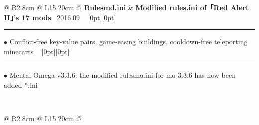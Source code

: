 {{\begin{tabularx}{\linewidth}{@{} R{2.8cm} @{\phantom{d}} L{15.20cm} @{}}
	\textbf{Rulesmd.ini} & \hspace{10pt} \textbf{Modified rules.ini of「Red Alert II」's 17 mods} \hfill \textendash\ 2016.09 \newline \vspace{2pt} \ \hspace{-3pt} \raisebox{0.09\height}[0pt][0pt]{\vrule width0.5pt height30.0pt} \hspace{-0.30em}\rule[0.25em]{1.0em}{0.5pt}\!\! $\bullet$ {\small Conflict-free key-value pairs, game-easing buildings, cooldown-free teleporting minecarts} \newline \vspace{-3pt} \ \hspace{-3pt} \raisebox{0.18\height}[0pt][0pt]{\vrule width0.5pt height14.5pt} \hspace{-0.30em}\rule[0.25em]{1.0em}{0.5pt}\!\! $\bullet$ {\small Mental Omega v3.3.6: the modified rulesmo.ini for mo-3.3.6 has now been added} \hfill {\small \color{color-detail} *.ini} \href{https://github.com/ChenZhu-Xie/rulesmd.ini}{\color{black!50}\faGithub} \\ \Gap\Gap\Gap
\end{tabularx}
\\
\begin{tabularx}{\linewidth}{@{} R{2.8cm} @{\phantom{d}} L{15.20cm} @{}}

\end{tabularx}}}
